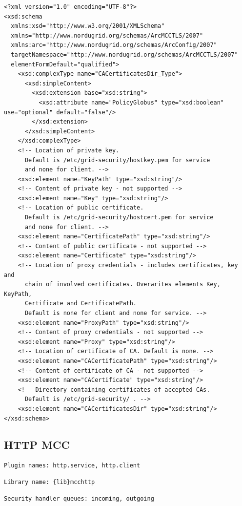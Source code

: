 \documentclass{book}
\begin{document}
\begin{verbatim}
<?xml version="1.0" encoding="UTF-8"?>
<xsd:schema
  xmlns:xsd="http://www.w3.org/2001/XMLSchema"
  xmlns="http://www.nordugrid.org/schemas/ArcMCCTLS/2007"
  xmlns:arc="http://www.nordugrid.org/schemas/ArcConfig/2007"
  targetNamespace="http://www.nordugrid.org/schemas/ArcMCCTLS/2007"
  elementFormDefault="qualified">
    <xsd:complexType name="CACertificatesDir_Type">
      <xsd:simpleContent>
        <xsd:extension base="xsd:string">
          <xsd:attribute name="PolicyGlobus" type="xsd:boolean" use="optional" default="false"/>
        </xsd:extension>
      </xsd:simpleContent>
    </xsd:complexType>
    <!-- Location of private key.
      Default is /etc/grid-security/hostkey.pem for service
      and none for client. -->
    <xsd:element name="KeyPath" type="xsd:string"/>
    <!-- Content of private key - not supported -->
    <xsd:element name="Key" type="xsd:string"/>
    <!-- Location of public certificate.
      Default is /etc/grid-security/hostcert.pem for service
      and none for client. -->
    <xsd:element name="CertificatePath" type="xsd:string"/>
    <!-- Content of public certificate - not supported -->
    <xsd:element name="Certificate" type="xsd:string"/>
    <!-- Location of proxy credentials - includes certificates, key and
      chain of involved certificates. Overwrites elements Key, KeyPath,
      Certificate and CertificatePath.
      Default is none for client and none for service. -->
    <xsd:element name="ProxyPath" type="xsd:string"/>
    <!-- Content of proxy credentials - not supported -->
    <xsd:element name="Proxy" type="xsd:string"/>
    <!-- Location of certificate of CA. Default is none. -->
    <xsd:element name="CACertificatePath" type="xsd:string"/>
    <!-- Content of certificate of CA - not supported -->
    <xsd:element name="CACertificate" type="xsd:string"/>
    <!-- Directory containing certificates of accepted CAs.
      Default is /etc/grid-security/ . -->
    <xsd:element name="CACertificatesDir" type="xsd:string"/>
</xsd:schema>
\end{verbatim}

\subsection{HTTP MCC}

\texttt{Plugin names: http.service, http.client}

\texttt{Library name: \{lib\}mcchttp}

\texttt{Security handler queues: incoming, outgoing}
\end{document}
